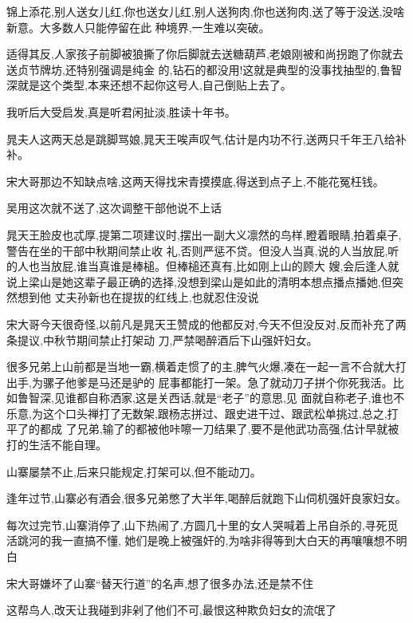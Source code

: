 ﻿\documentclass[12pt]{article}
\begin{document}
锦上添花,别人送女儿红,你也送女儿红,别人送狗肉,你也送狗肉,送了等于没送,没啥新意。大多数人只能停留在此
种境界,一生难以突破。

适得其反,人家孩子前脚被狼撕了你后脚就去送糖葫芦,老娘刚被和尚拐跑了你就去送贞节牌坊,还特别强调是纯金
的,钻石的都没用!这就是典型的没事找抽型的,鲁智深就是这个类型,本来还想不起你这号人,自己倒贴上去了。

我听后大受启发,真是听君闲扯淡,胜读十年书。

晁夫人这两天总是跳脚骂娘,晁天王唉声叹气,估计是内功不行,送两只千年王八给补补。

宋大哥那边不知缺点啥,这两天得找宋青摸摸底,得送到点子上,不能花冤枉钱。

吴用这次就不送了,这次调整干部他说不上话\dldots

晁天王脸皮也忒厚,提第二项建议时,摆出一副大义凛然的鸟样,瞪着眼睛,拍着桌子,警告在坐的干部中秋期间禁止收
礼,否则严惩不贷。但没人当真,说的人当放屁,听的人也当放屁,谁当真谁是棒槌。但棒槌还真有,比如刚上山的顾大
嫂,会后逢人就说上梁山是她这辈子最正确的选择,没想到梁山是如此的清明\dldots 本想点播点播她,但突然想到他
丈夫孙新也在提拔的红线上,也就忍住没说\dldots

宋大哥今天很奇怪,以前凡是晁天王赞成的他都反对,今天不但没反对,反而补充了两条提议,中秋节期间禁止打架动
刀,严禁喝醉酒后下山强奸妇女。

很多兄弟上山前都是当地一霸,横着走惯了的主,脾气火爆,凑在一起一言不合就大打出手,为骡子他爹是马还是驴的
屁事都能打一架。急了就动刀子拼个你死我活。比如鲁智深,见谁都自称洒家,这是关西话,就是``老子''的意思,见
面就自称老子,谁也不乐意,为这个口头禅打了无数架,跟杨志拼过、跟史进干过、跟武松单挑过,总之,打平了的都成
了兄弟,输了的都被他咔嚓一刀结果了,要不是他武功高强,估计早就被打的生活不能自理。

山寨屡禁不止,后来只能规定,打架可以,但不能动刀。

逢年过节,山寨必有酒会,很多兄弟憋了大半年,喝醉后就跑下山伺机强奸良家妇女。

每次过完节,山寨消停了,山下热闹了,方圆几十里的女人哭喊着上吊自杀的,寻死觅活跳河的\dldots 我一直搞不懂,
她们是晚上被强奸的,为啥非得等到大白天的再嚷嚷\dldots 想不明白

宋大哥嫌坏了山寨``替天行道''的名声,想了很多办法,还是禁不住\dldots

这帮鸟人,改天让我碰到非剁了他们不可,最恨这种欺负妇女的流氓了\dldots

\section{}
\end{document}
